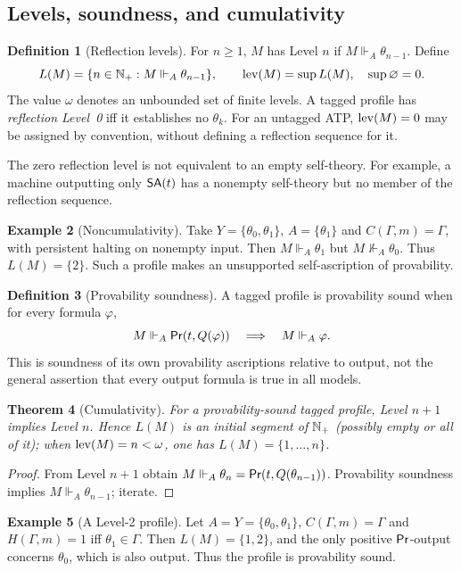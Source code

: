 \documentclass[11pt,letterpaper]{article}
\newtheorem{theorem}{Theorem}[section]\newtheorem{proposition}[theorem]{Proposition}\newtheorem{lemma}[theorem]{Lemma}\newtheorem{corollary}[theorem]{Corollary}\newtheorem{conjecture}[theorem]{Conjecture}\theoremstyle{definition}\newtheorem{definition}[theorem]{Definition}\newtheorem{example}[theorem]{Example}\newtheorem{remark}[theorem]{Remark}
\begin{document}
\subsection{Levels, soundness, and cumulativity}
\begin{definition}[Reflection levels]
For $n\ge1$, $M$ has Level $n$ if $M\Vdash_A\theta_{n-1}$. Define
\[
L(M)=\{n\in\mathbb N_{+}:M\Vdash_A\theta_{n-1}\},\qquad \operatorname{lev}(M)=\sup L(M),\quad \sup\varnothing=0.
\]
The value $\omega$ denotes an unbounded set of finite levels. A tagged profile has \emph{reflection Level~0} iff it establishes no $\theta_k$. For an untagged ATP, $\operatorname{lev}(M)=0$ may be assigned by convention, without defining a reflection sequence for it.
\end{definition}
The zero reflection level is not equivalent to an empty self-theory. For example, a machine outputting only $\mathsf{SA}(t)$ has a nonempty self-theory but no member of the reflection sequence.

\begin{example}[Noncumulativity]
Take $Y=\{\theta_0,\theta_1\}$, $A=\{\theta_1\}$ and $C(\Gamma,m)=\Gamma$, with persistent halting on nonempty input. Then $M\Vdash_A\theta_1$ but $M\not\Vdash_A\theta_0$. Thus $L(M)=\{2\}$. Such a profile makes an unsupported self-ascription of provability.
\end{example}
\begin{definition}[Provability soundness]
A tagged profile is provability sound when for every formula $\varphi$,
\[
M\Vdash_A\mathsf{Pr}(t,Q(\varphi))\quad\Longrightarrow\quad M\Vdash_A\varphi.
\]
This is soundness of its own provability ascriptions relative to output, not the general assertion that every output formula is true in all models.
\end{definition}
\begin{theorem}[Cumulativity]
For a provability-sound tagged profile, Level $n+1$ implies Level $n$. Hence $L(M)$ is an initial segment of $\mathbb N_{+}$ (possibly empty or all of it); when $\operatorname{lev}(M)=n<\omega$, one has $L(M)=\{1,\ldots,n\}$.
\end{theorem}
\begin{proof}
From Level $n+1$ obtain $M\Vdash_A\theta_n=\mathsf{Pr}(t,Q(\theta_{n-1}))$. Provability soundness implies $M\Vdash_A\theta_{n-1}$; iterate.
\end{proof}
\begin{example}[A Level-2 profile]
Let $A=Y=\{\theta_0,\theta_1\}$, $C(\Gamma,m)=\Gamma$ and $H(\Gamma,m)=1$ iff $\theta_1\in\Gamma$. Then $L(M)=\{1,2\}$, and the only positive $\mathsf{Pr}$-output concerns $\theta_0$, which is also output. Thus the profile is provability sound.
\end{example}
\end{document}
